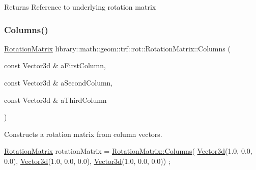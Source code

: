 \begin{DoxyReturn}{Returns}
Reference to underlying rotation matrix 
\end{DoxyReturn}
\mbox{\label{classlibrary_1_1math_1_1geom_1_1trf_1_1rot_1_1_rotation_matrix_a5f5385bb26c6a64d869030d7f3bf7b4d}} 
\subsubsection{\texorpdfstring{Columns()}{Columns()}}
{\footnotesize\ttfamily \hyperlink{classlibrary_1_1math_1_1geom_1_1trf_1_1rot_1_1_rotation_matrix}{Rotation\+Matrix} library\+::math\+::geom\+::trf\+::rot\+::\+Rotation\+Matrix\+::\+Columns (\begin{DoxyParamCaption}\item[{const Vector3d \&}]{a\+First\+Column,  }\item[{const Vector3d \&}]{a\+Second\+Column,  }\item[{const Vector3d \&}]{a\+Third\+Column }\end{DoxyParamCaption})\hspace{0.3cm}{\ttfamily [static]}}



Constructs a rotation matrix from column vectors. 


\begin{DoxyCode}
\hyperlink{classlibrary_1_1math_1_1geom_1_1trf_1_1rot_1_1_rotation_matrix_a667d2c05aa5b0cc88775938d11164cdc}{RotationMatrix} rotationMatrix = \hyperlink{classlibrary_1_1math_1_1geom_1_1trf_1_1rot_1_1_rotation_matrix_a5f5385bb26c6a64d869030d7f3bf7b4d}{RotationMatrix::Columns}(
      \hyperlink{namespacelibrary_1_1math_1_1obj_a977e84e9bf317a4e7dd9d6d671d6da2f}{Vector3d}(1.0, 0.0, 0.0), \hyperlink{namespacelibrary_1_1math_1_1obj_a977e84e9bf317a4e7dd9d6d671d6da2f}{Vector3d}(1.0, 0.0, 0.0), \hyperlink{namespacelibrary_1_1math_1_1obj_a977e84e9bf317a4e7dd9d6d671d6da2f}{Vector3d}(1.0, 0.0, 0.0)) ;
\end{DoxyCode}



